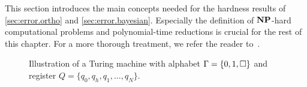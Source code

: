 This section introduces the main concepts needed for the hardness results of \cref{sec:error.ortho} and \ref{sec:error.bayesian}.
Especially the definition of $\mathbf{NP}$-hard computational problems and polynomial-time reductions is crucial for the rest of this chapter.
For a more thorough treatment, we refer the reader to~\cite{Arora_2009_Computational,Garey_2002_Computers}.

\begin{figure*}
  \centering
  
  \caption{%
    Illustration of a Turing machine with alphabet $\Gamma = \{0, 1, \square\}$ and register $Q = \{q_0, q_h, q_1, \ldots, q_N\}$.
    }%
  \label{fig:complexity.turingmachine}
\end{figure*}

